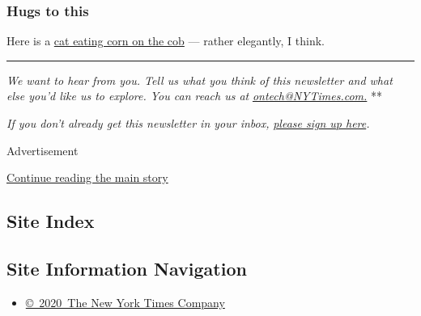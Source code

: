 \hypertarget{hugs-to-this}{%
\subsubsection{Hugs to this}\label{hugs-to-this}}

Here is a
\href{https://twitter.com/kwatt/status/1285728300128665601}{cat eating
corn on the cob} --- rather elegantly, I think.

\begin{center}\rule{0.5\linewidth}{\linethickness}\end{center}

\emph{We want to hear from you. Tell us what you think of this
newsletter and what else you'd like us to explore. You can reach us at}
\href{mailto:ontech@NYTimes.com?subject=On\%20Tech\%20Feedback}{\emph{ontech@NYTimes.com.}}
**

\emph{If you don't already get this newsletter in your inbox,}
\href{https://www.nytimes3xbfgragh.onion/newsletters/signup/OT}{\emph{please
sign up here}}\emph{.}

Advertisement

\protect\hyperlink{after-bottom}{Continue reading the main story}

\hypertarget{site-index}{%
\subsection{Site Index}\label{site-index}}

\hypertarget{site-information-navigation}{%
\subsection{Site Information
Navigation}\label{site-information-navigation}}

\begin{itemize}
\tightlist
\item
  \href{https://help.nytimes3xbfgragh.onion/hc/en-us/articles/115014792127-Copyright-notice}{©~2020~The
  New York Times Company}
\end{itemize}

